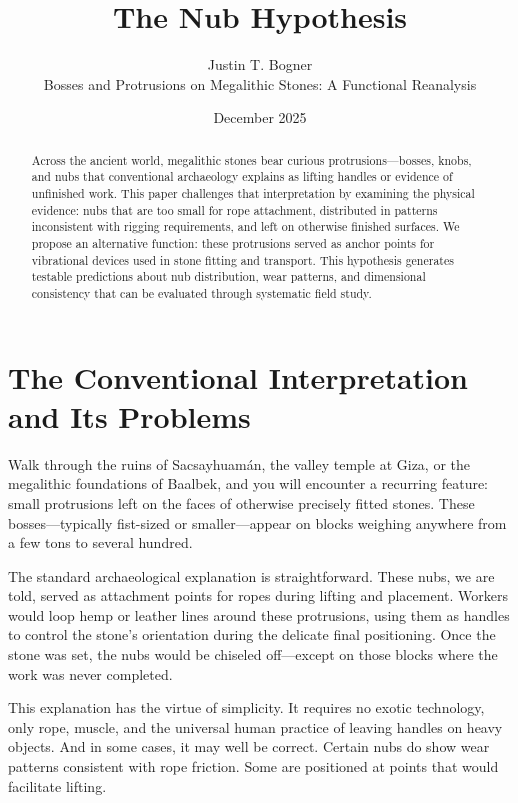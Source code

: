 \documentclass[11pt]{article}
\title{The Nub Hypothesis}
\author{Justin T. Bogner\\[0.5em]\small Bosses and Protrusions on Megalithic Stones: A Functional Reanalysis}
\date{December 2025}
\begin{document}
\maketitle
\thispagestyle{empty}

\begin{abstract}
Across the ancient world, megalithic stones bear curious protrusions—bosses, knobs, and nubs that conventional archaeology explains as lifting handles or evidence of unfinished work. This paper challenges that interpretation by examining the physical evidence: nubs that are too small for rope attachment, distributed in patterns inconsistent with rigging requirements, and left on otherwise finished surfaces. We propose an alternative function: these protrusions served as anchor points for vibrational devices used in stone fitting and transport. This hypothesis generates testable predictions about nub distribution, wear patterns, and dimensional consistency that can be evaluated through systematic field study.
\end{abstract}

\tableofcontents
\newpage

\section{The Conventional Interpretation and Its Problems}

Walk through the ruins of Sacsayhuamán, the valley temple at Giza, or the megalithic foundations of Baalbek, and you will encounter a recurring feature: small protrusions left on the faces of otherwise precisely fitted stones. These bosses—typically fist-sized or smaller—appear on blocks weighing anywhere from a few tons to several hundred.

The standard archaeological explanation is straightforward. These nubs, we are told, served as attachment points for ropes during lifting and placement. Workers would loop hemp or leather lines around these protrusions, using them as handles to control the stone's orientation during the delicate final positioning. Once the stone was set, the nubs would be chiseled off—except on those blocks where the work was never completed.

This explanation has the virtue of simplicity. It requires no exotic technology, only rope, muscle, and the universal human practice of leaving handles on heavy objects. And in some cases, it may well be correct. Certain nubs do show wear patterns consistent with rope friction. Some are positioned at points that would facilitate lifting.
\end{document}
